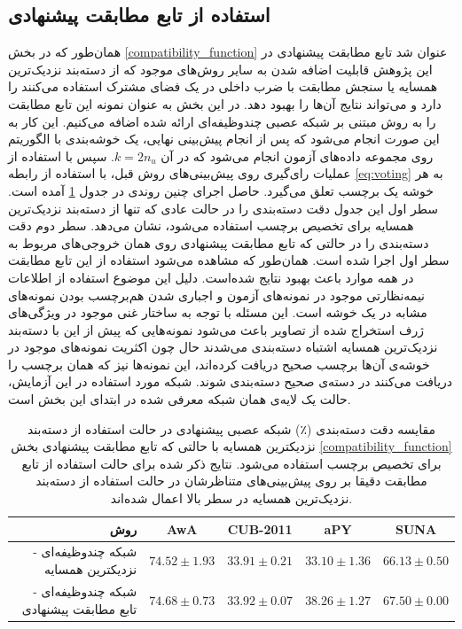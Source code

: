 \subsection{استفاده از تابع مطابقت پیشنهادی}\label{exp:nn_comp}
همان‌طور که در بخش \ref{compatibility_function} عنوان شد تابع مطابقت پیشنهادی  در این پژوهش قابلیت اضافه شدن به سایر روش‌های موجود که از دسته‌بند نزدیک‌ترین همسایه یا سنجش مطابقت با ضرب داخلی در یک فضای مشترک استفاده می‌کنند را دارد و می‌تواند نتایج آن‌ها را بهبود دهد. در این بخش به عنوان نمونه این تابع مطابقت را به روش مبتنی بر شبکه عصبی چندوظیفه‌ای ارائه شده اضافه می‌کنیم. این کار به این صورت انجام می‌شود که پس از انجام پیش‌بینی نهایی، یک خوشه‌بندی با الگوریتم  روی مجموعه داده‌های آزمون انجام می‌شود که در آن $k=2n_u$. سپس با استفاده از عملیات رای‌گیری روی پیش‌بینی‌های روش قبل، با استفاده از رابطه \eqref{eq:voting} به هر خوشه یک برچسب تعلق می‌گیرد. حاصل اجرای چنین روندی در جدول \ref{tab:nn_comp} آمده است. سطر اول این جدول دقت دسته‌بندی را در حالت عادی که تنها از دسته‌بند نزدیک‌ترین همسایه برای تخصیص برچسب استفاده می‌شود، نشان می‌دهد. سطر دوم دقت دسته‌بندی را در حالتی که تابع مطابقت پیشنهادی روی همان خروجی‌های مربوط به سطر اول اجرا شده است. همان‌طور که مشاهده می‌شود استفاده از این تابع مطابقت در همه موارد باعث بهبود نتایج شده‌است. دلیل این موضوع استفاده از اطلاعات نیمه‌نظارتی موجود در نمونه‌های آزمون و  اجباری شدن هم‌برچسب بودن نمونه‌های مشابه در یک خوشه است.  این مسئله با توجه به ساختار غنی موجود در ویژگی‌های ژرف استخراج شده از تصاویر باعث می‌شود نمونه‌هایی که پیش از این با دسته‌بند نزدیک‌ترین همسایه اشتباه دسته‌بندی می‌شدند حال چون اکثریت نمونه‌های موجود در خوشه‌ی آن‌ها برچسب صحیح دریافت کرده‌اند، این نمونه‌ها نیز که همان برچسب را دریافت می‌کنند در دسته‌ی صحیح دسته‌بندی شوند.
 شبکه مورد استفاده در این آزمایش، حالت یک لایه‌ی همان شبکه معرفی شده در ابتدای این بخش است.
\begin{table}[t]
\caption [دقت دسته‌بندی با شبکه عصبی به همراه تابع مطابقت پیشنهادی]{
مقایسه دقت دسته‌بندی (٪) شبکه عصبی پیشنهادی در حالت استفاده از دسته‌بند نزدیکترین همسایه با حالتی که تابع مطابقت پیشنهادی بخش  \ref{compatibility_function} برای تخصیص برچسب استفاده می‌شود.
نتایج ذکر شده برای حالت استفاده از تابع مطابقت دقیقا بر روی پیش‌بینی‌های متناظرشان در حالت استفاده از دسته‌بند نزدیک‌ترین همسایه در سطر بالا اعمال شده‌اند.
}
\label{tab:nn_comp}
\begin{center}
\begin{tabular}{|r|c|c|c|c|}
\hline
روش  & AwA & CUB-2011 & aPY & SUNA \\
\hline
شبکه چندوظیفه‌ای - نزدیکترین همسایه
                & {${74.52 \pm 1.93}$}  & {${33.91 \pm 0.21}$} & ${33.10 \pm 1.36}$ & { ${66.13 \pm 0.50}$} \\ \hline
شبکه  چندوظیفه‌ای - تابع مطابقت پیشنهادی
                      & $74.68 \pm 0.73$  & \textbf{${33.92 \pm 0.07}$} & \textbf{${38.26 \pm 1.27}$} & \textbf{ ${67.50 \pm 0.00}$} \\ \hline
\end{tabular}

\end{center}
\end{table}
